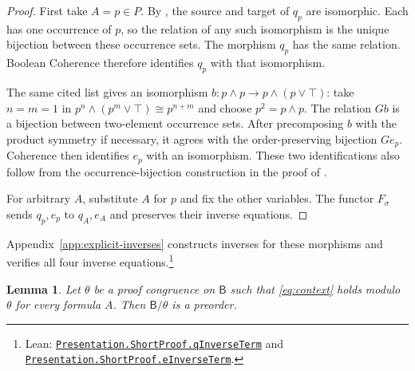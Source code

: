 \documentclass[11pt]{article}
\newtheorem{lemma}[theorem]{Lemma}
\newcommand{\B}{\mathsf B}
\begin{document}
\begin{proof}
First take $A=p\in P$. By \cite[\S12.5, p.~294]{DP}, the source
and target of $q_p$ are isomorphic. Each has one occurrence of $p$,
so the relation of any such isomorphism is the unique bijection
between these occurrence sets. The morphism $q_p$ has the same relation.
Boolean Coherence therefore identifies $q_p$ with that isomorphism.

The same cited list gives an isomorphism
$b:p\wedge p\to p\wedge(p\vee\top)$: take $n=m=1$ in
$p^n\wedge(p^m\vee\top)\cong p^{n+m}$ and choose $p^2=p\wedge p$.
The relation $Gb$ is a bijection between two-element occurrence sets.
After precomposing $b$ with the product symmetry if necessary, it
agrees with the order-preserving bijection $Ge_p$. Coherence then
identifies $e_p$ with an isomorphism. These two identifications also
follow from the occurrence-bijection construction in the proof of
\cite[Lemma~7]{DPIsomorphic}.

For arbitrary $A$, substitute $A$ for $p$ and fix the other variables.
The functor $F_\sigma$ sends $q_p,e_p$ to $q_A,e_A$ and preserves
their inverse equations.
\end{proof}

Appendix~\ref{app:explicit-inverses} constructs inverses for
these morphisms and verifies all four inverse equations.\footnote{\raggedright Lean:
\href{https://github.com/flengyel/Dosen-Petric-Maximality/blob/5dbee39bea09539bd130f729e82636419f71f920/DosenPetric/PresentationShortQ.lean\#L17}{\texttt{Presentation.ShortProof.\allowbreak{}qInverseTerm}} and
\href{https://github.com/flengyel/Dosen-Petric-Maximality/blob/5dbee39bea09539bd130f729e82636419f71f920/DosenPetric/PresentationShortE.lean\#L30}{\texttt{Presentation.ShortProof.\allowbreak{}eInverseTerm}}.}

\begin{lemma}\label{lem:collapse}
Let $\theta$ be a proof congruence on $\B$ such that
\eqref{eq:context} holds modulo $\theta$ for every formula $A$.
Then $\B/\theta$ is a preorder.
\end{lemma}
\end{document}
